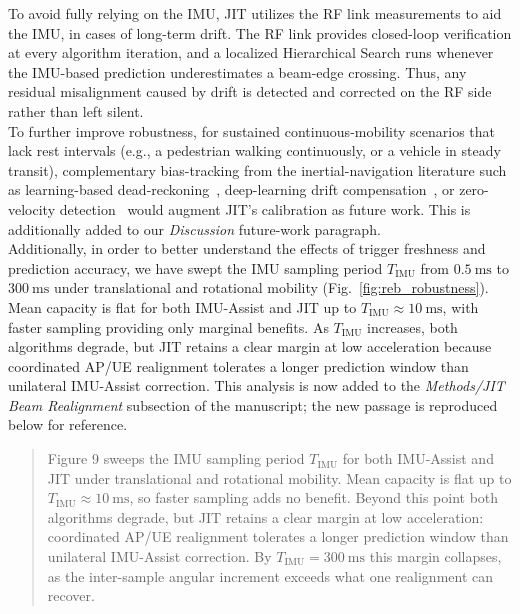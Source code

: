 \documentclass{article}
\begin{document}
To avoid fully relying on the IMU, JIT utilizes the RF link measurements to aid the IMU, in cases of long-term drift. The RF link provides closed-loop verification at every algorithm iteration, and a localized Hierarchical Search runs whenever the IMU-based prediction underestimates a beam-edge crossing. Thus, any residual misalignment caused by drift is detected and corrected on the RF side rather than left silent.\\

\noindent To further improve robustness, for sustained continuous-mobility scenarios that lack rest intervals (e.g., a pedestrian walking continuously, or a vehicle in steady transit), complementary bias-tracking from the inertial-navigation literature such as learning-based dead-reckoning~\cite{Brossard2020AIIMU}, deep-learning drift compensation~\cite{Chen2024DLInertial}, or zero-velocity detection~\cite{Skog2010ZUPT} would augment JIT's calibration as future work. This is additionally added to our \emph{Discussion} future-work paragraph.\\

\noindent Additionally, in order to better understand the effects of trigger freshness and prediction accuracy, we have swept the IMU sampling period $T_{\text{IMU}}$ from $\SI{0.5}{\milli\second}$ to $\SI{300}{\milli\second}$ under translational and rotational mobility (Fig.~\ref{fig:reb_robustness}). Mean capacity is flat for both IMU-Assist and JIT up to $T_{\text{IMU}} \approx \SI{10}{\milli\second}$, with faster sampling providing only marginal benefits. As $T_{\text{IMU}}$ increases, both algorithms degrade, but JIT retains a clear margin at low acceleration because coordinated AP/UE realignment tolerates a longer prediction window than unilateral IMU-Assist correction. This analysis is now added to the \emph{Methods/JIT Beam Realignment} subsection of the manuscript; the new passage is reproduced below for reference.

\begin{quote}
{\color{cyan!75!black}
Figure 9 sweeps the IMU sampling period $T_{\text{IMU}}$ for both IMU-Assist and JIT under translational and rotational mobility. Mean capacity is flat up to $T_{\text{IMU}} \approx \SI{10}{\milli\second}$, so faster sampling adds no benefit. Beyond this point both algorithms degrade, but JIT retains a clear margin at low acceleration: coordinated AP/UE realignment tolerates a longer prediction window than unilateral IMU-Assist correction. By $T_{\text{IMU}} = \SI{300}{\milli\second}$ this margin collapses, as the inter-sample angular increment exceeds what one realignment can recover.
}
\end{quote}
\end{document}
